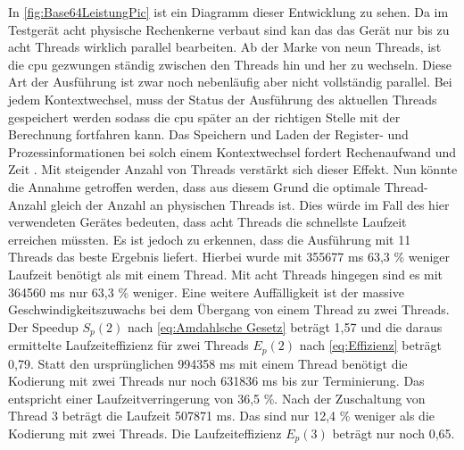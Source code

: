 In \autoref{fig:Base64LeistungPic} ist ein Diagramm dieser Entwicklung zu sehen. Da im Testgerät acht physische Rechenkerne verbaut sind kan das das Gerät nur bis zu acht Threads wirklich parallel bearbeiten. Ab der Marke von neun Threads, ist die \ac{cpu} gezwungen ständig zwischen den Threads hin und her zu wechseln. Diese Art der Ausführung ist zwar noch nebenläufig aber nicht vollständig parallel. Bei jedem Kontextwechsel, muss der Status der Ausführung des aktuellen Threads gespeichert werden sodass die \ac{cpu} später an der richtigen Stelle mit der Berechnung fortfahren kann. Das Speichern und Laden der Register- und Prozessinformationen bei solch einem Kontextwechsel fordert Rechenaufwand und Zeit \cite[2]{MultiThreadingThesis}. Mit steigender Anzahl von Threads verstärkt sich dieser Effekt. Nun könnte die Annahme getroffen werden, dass aus diesem Grund die optimale Thread-Anzahl gleich der Anzahl an physischen Threads ist. Dies würde im Fall des hier verwendeten Gerätes bedeuten, dass acht Threads die schnellste Laufzeit erreichen müssten. Es ist jedoch zu erkennen, dass die Ausführung mit 11 Threads das beste Ergebnis liefert. Hierbei wurde mit 355677 \ac{ms} 63,3 \% weniger Laufzeit benötigt als mit einem Thread. Mit acht Threads hingegen sind es mit 364560 \ac{ms} nur 63,3 \% weniger. Eine weitere Auffälligkeit ist der massive Geschwindigkeitszuwachs bei dem Übergang von einem Thread zu zwei Threads. Der Speedup $S_{p}(2)$ nach \autoref{eq:Amdahlsche Gesetz} beträgt 1,57 und die daraus ermittelte Laufzeiteffizienz für zwei Threads $E_{ p }(2)$ nach \autoref{eq:Effizienz} beträgt 0,79. Statt den ursprünglichen 994358 \ac{ms} mit einem Thread benötigt die Kodierung mit zwei Threads nur noch 631836 \ac{ms} bis zur Terminierung. Das entspricht einer Laufzeitverringerung von  36,5 \%. Nach der Zuschaltung von Thread 3 beträgt die Laufzeit 507871 \ac{ms}. Das sind nur 12,4 \% weniger als die Kodierung mit zwei Threads. Die Laufzeiteffizienz $E_{ p }(3)$ beträgt nur noch 0,65. 

